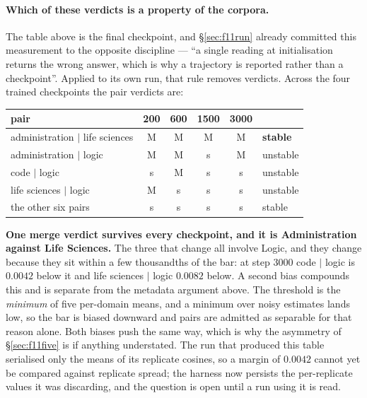 \documentclass[11pt]{article}
\begin{document}
\paragraph{Which of these verdicts is a property of the corpora.} The table above is the final checkpoint, and \S\ref{sec:f11run} already committed this measurement to the opposite discipline --- ``a single reading at initialisation returns the wrong answer, which is why a trajectory is reported rather than a checkpoint''. Applied to its own run, that rule removes verdicts. Across the four trained checkpoints the pair verdicts are:

\begin{center}
\begin{tabular}{@{}lcccc l@{}}
\toprule
pair & 200 & 600 & 1500 & 3000 & \\
\midrule
administration $\vert$ life sciences & M & M & M & M & \textbf{stable} \\
administration $\vert$ logic         & M & M & s & M & unstable \\
code $\vert$ logic                   & s & M & s & s & unstable \\
life sciences $\vert$ logic          & M & s & s & s & unstable \\
the other six pairs                  & s & s & s & s & stable \\
\bottomrule
\end{tabular}
\end{center}

\textbf{One merge verdict survives every checkpoint, and it is Administration against Life Sciences.} The three that change all involve Logic, and they change because they sit within a few thousandths of the bar: at step 3000 code $\vert$ logic is $0.0042$ below it and life sciences $\vert$ logic $0.0082$ below. A second bias compounds this and is separate from the metadata argument above. The threshold is the \emph{minimum} of five per-domain means, and a minimum over noisy estimates lands low, so the bar is biased downward and pairs are admitted as separable for that reason alone. Both biases push the same way, which is why the asymmetry of \S\ref{sec:f11five} is if anything understated. The run that produced this table serialised only the means of its replicate cosines, so a margin of $0.0042$ cannot yet be compared against replicate spread; the harness now persists the per-replicate values it was discarding, and the question is open until a run using it is read.
\end{document}
